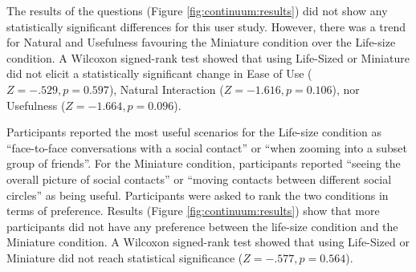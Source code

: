 The results of the questions (Figure \ref{fig:continuum:results}) did not show any statistically significant differences for this user study. However, there was a trend for Natural and Usefulness favouring the Miniature condition over the Life-size condition. A Wilcoxon signed-rank test showed that using Life-Sized or Miniature did not elicit a statistically significant change in Ease of Use ($Z=-.529, p=0.597$), Natural Interaction ($Z=-1.616, p=0.106$), nor Usefulness ($Z=-1.664, p=0.096$). 

Participants reported the most useful scenarios for the Life-size condition as \enquote{face-to-face conversations with a social contact} or \enquote{when zooming into a subset group of friends}. For the Miniature condition, participants reported \enquote{seeing the overall picture of social contacts} or \enquote{moving contacts between different social circles} as being useful. Participants were asked to rank the two conditions in terms of preference. Results (Figure \ref{fig:continuum:results}) show that more participants did not have any preference between the life-size condition and the Miniature condition. A Wilcoxon signed-rank test showed that using Life-Sized or Miniature did not reach statistical significance ($Z=-.577, p=0.564$).


